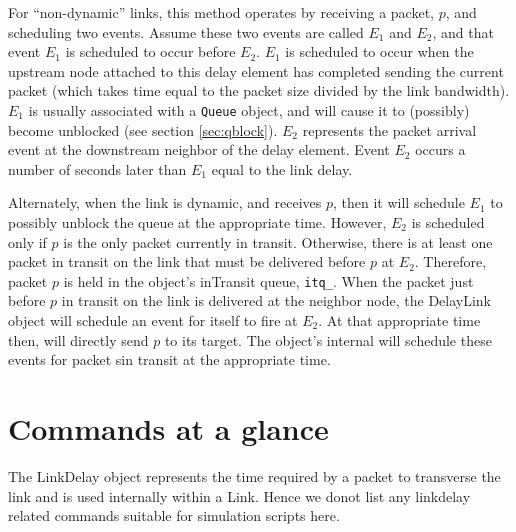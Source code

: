 For ``non-dynamic'' links,
this method operates by receiving a packet, $p$,  and scheduling two
events.
Assume these two events are called $E_1$ and $E_2$, and that
event $E_1$ is scheduled to occur before $E_2$.
$E_1$ is scheduled to occur when the upstream node attached to this
delay element has completed sending the current packet
(which takes time equal to the packet size divided by the link bandwidth).
$E_1$ is usually associated with a {\tt Queue} object, and will
cause it to (possibly) become unblocked (see section \ref{sec:qblock}).
$E_2$ represents the packet arrival event at the downstream neighbor
of the delay element.
Event $E_2$ occurs a number of seconds later than $E_1$ equal to the
link delay.

Alternately, when the link is dynamic, and receives  $p$, then
it will schedule $E_1$ to possibly unblock the queue at the
appropriate time.
However, $E_2$ is scheduled only
if $p$ is the only packet currently in transit.
Otherwise, there is at least one packet in transit on the link that must
be delivered before $p$ at $E_2$.
Therefore, packet $p$ is held in the object's inTransit queue, {\tt itq\_}.
When the packet just before $p$ in transit on the link is delivered
at the neighbor node, 
the DelayLink object will schedule an event for itself to fire at $E_2$.
At that appropriate time then, 
will directly send $p$ to its target.
The object's internal
will schedule these events for packet sin transit at the appropriate time.

\section{Commands at a glance}

The LinkDelay object represents the time required by a packet to
transverse the link and is used internally within a Link. Hence we donot
list any linkdelay related commands suitable for simulation scripts here.

